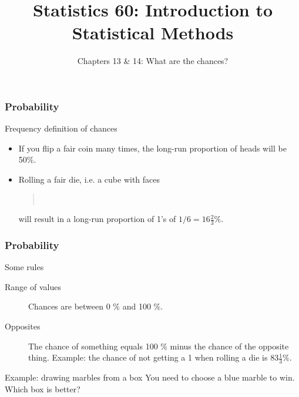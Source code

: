 \documentclass[handout]{beamer}
\title{Statistics 60: Introduction to Statistical Methods}
\subtitle{Chapters 13 \& 14: What are the chances?}
\author{}%
\begin{document}
   \begin{frame}
   \titlepage
   \end{frame}


   \begin{frame} \frametitle{Probability}

   \begin{block}
   {Frequency definition of chances}
   \begin{itemize}
   \item If you flip a fair coin many times, the long-run
   proportion of heads will be 50\%.

   \item Rolling a fair die, i.e. a cube with faces
   \begin{quote}
    \  \  \  \  \ 
   \end{quote}
   will result in a long-run proportion of 1's of $1/6=16 \frac{2}{3}\%$.

   \end{itemize}
   \end{block}
   \end{frame}


   \begin{frame} \frametitle{Probability}

   \begin{block}
   {Some rules}
   \begin{description}
     \item[Range of values] Chances are between 0 \% and 100 \%.
     \item[Opposites] The chance of something equals 100 \% minus
     the chance of the opposite thing. Example: the chance
     of not getting a 1 when rolling a die is $83 \frac{1}{3} \%$.
   \end{description}
   \end{block}

   \begin{block}
   {Example: drawing marbles from a box}
   You need to choose a blue marble to win.
   Which box is better?
   \end{block}
   \end{frame}
\end{document}
